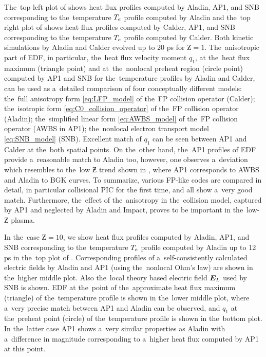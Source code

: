 The~top left plot of  shows heat flux 
profiles computed by Aladin, AP1, and SNB corresponding to the~temperature 
$T_e$ profile computed by Aladin and the~top right plot of 
 shows heat flux profiles computed by Calder, 
AP1, and SNB corresponding to the~temperature $T_e$ profile computed by Calder.
Both kinetic simulations by Aladin and Calder evolved up to 20 ps for 
$\Zbar = 1$. 
The~anisotropic part of EDF, in particular, the~heat flux velocity moment $q_1$, 
at the~heat flux maximum (triangle point) and at~the~nonlocal preheat region 
(circle point) computed by AP1 and SNB for the~temperature profiles by 
Aladin and Calder, can be used as a~detailed comparison of four conceptually
different models: the~full anisotropy form \eqref{eq:LFP_model} of 
the~FP collision operator (Calder); the~isotropic form 
\eqref{eq:C0_collision_operator} of the~FP collision operator (Aladin);
the~simplified linear form \eqref{eq:AWBS_model} of the~FP collision operator
(AWBS in AP1); 
the~nonlocal electron transport model \eqref{eq:SNB_model} (SNB). 
Excellent match of $q_1$ can be seen between 
AP1 and Calder at the~both spatial points. On the~other hand, 
the~AP1 profiles of EDF provide a~reasonable match to Aladin too, however,
one observes a~deviation
which resembles to the~low $\Zbar$ trend shown in , 
where AP1 corresponds to AWBS and Aladin to BGK curves. To summarize,
various FP-like codes are compared in detail, in particular collisional PIC 
for the first time, and all show a~very good match. 
Furthermore, the~effect of the~anisotropy in the~collision model, 
captured by AP1 and neglected by Aladin and Impact, proves to be important
in the~low-$\Zbar$ plasma. 

In the~case $\Zbar = 10$, we show heat flux profiles
computed by Aladin, AP1, and SNB corresponding to the~temperature $T_e$
profile computed by Aladin up to 12 ps 
in the~top plot of . 
Corresponding profiles of 
a~self-consistently calculated electric fields by Aladin and AP1 
(using the~nonlocal Ohm's law) are shown in the~higher middle plot.
Also the~local theory based electric field $\boldsymbol{E}_L$ used by SNB is shown.
EDF at the~point of the~approximate heat flux maximum (triangle) of
the~temperature profile is shown in the~lower middle plot, 
where a~very precise match between AP1 and Aladin can be observed, 
and $q_1$ at the~preheat point (circle) of the~temperature profile is shown 
in the~bottom plot. In the~latter case AP1 shows a~very similar properties 
as Aladin with a~difference in magnitude corresponding to a~higher 
heat flux computed by AP1 at this point. 

